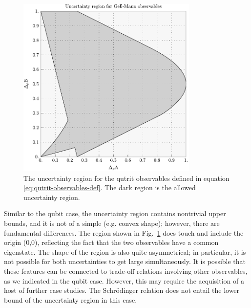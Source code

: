 \begin{figure}[t]\centering
  \includegraphics[width=0.8\textwidth]{figs/full-gellmann-ur-square}
  \caption[The uncertainty region for the qutrit observables defined in equation \eqref{eq:qutrit-observables-def}]{The uncertainty region for the qutrit observables defined in equation \eqref{eq:qutrit-observables-def}. The dark region is the allowed uncertainty region.}
  \label{fig:qutrit-uncertainty-region}
\end{figure}


Similar to the qubit case, the uncertainty region contains nontrivial upper bounds, and it is not of a simple (e.g. convex shape); however, there are fundamental differences. The region shown in Fig.~\ref{fig:qutrit-uncertainty-region} does touch and include the origin (0,0), reflecting the fact that the two observables have a common eigenstate. The shape of the region is also quite asymmetrical; in particular, it is not possible for both uncertainties to get large simultaneously. It is possible that these features can be connected to trade-off relations involving other observables, as we indicated in the qubit case. However, this may require the acquisition of a host of further case studies.
The Schr\"odinger relation does not entail the lower bound of the uncertainty region in this case. 

